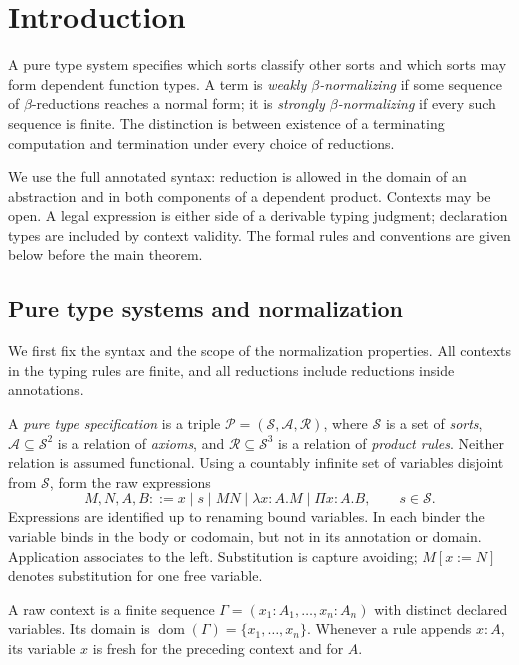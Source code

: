 \section{Introduction}\label{sec:introduction}

A pure type system specifies which sorts classify other sorts and which
sorts may form dependent function types.  A term is \emph{weakly
$\beta$-normalizing} if some sequence of $\beta$-reductions reaches a normal
form; it is \emph{strongly $\beta$-normalizing} if every such sequence is
finite.  The distinction is between existence of a terminating computation
and termination under every choice of reductions.

We use the full annotated syntax: reduction is allowed in the domain of
an abstraction and in both components of a dependent product. Contexts may
be open. A legal expression is either side of a derivable typing judgment;
declaration types are included by context validity. The formal rules and
conventions are given below before the main theorem.

\subsection{Pure type systems and normalization}\label{pts:setup}

We first fix the syntax and the scope of the normalization properties.
All contexts in the typing rules are finite, and all reductions include
reductions inside annotations.

\begin{definition}\label{pts:specification}
A \emph{pure type specification} is a triple
$\mathcal P=(\mathcal S,\mathcal A,\mathcal R)$, where $\mathcal S$ is a
set of \emph{sorts}, $\mathcal A\subseteq\mathcal S^2$ is a relation of
\emph{axioms}, and $\mathcal R\subseteq\mathcal S^3$ is a relation of
\emph{product rules}. Neither relation is assumed functional.
Using a countably infinite set of variables disjoint from $\mathcal S$, form the
raw expressions
\[
 M,N,A,B ::= x\mid s\mid MN\mid\lambda x:A.M\mid\Pi x:A.B,
 \qquad s\in\mathcal S.
\]
Expressions are identified up to renaming bound variables. In each binder
the variable binds in the body or codomain, but not in its annotation or
domain. Application associates to the left. Substitution is capture
avoiding; $M[x:=N]$ denotes substitution for one free variable.

A raw context is a finite sequence
$\Gamma=(x_1:A_1,\ldots,x_n:A_n)$ with distinct declared variables.
Its domain is $\operatorname{dom}(\Gamma)=\{x_1,\ldots,x_n\}$.
Whenever a rule appends $x:A$, its variable $x$ is fresh for the preceding
context and for $A$.
\end{definition}

